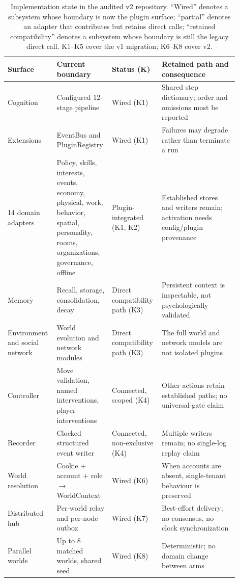 \begin{table}[t]
\centering
\small
\setlength{\tabcolsep}{4pt}
\caption{Implementation state in the audited v2 repository.  ``Wired''
denotes a subsystem whose boundary is now the plugin surface; ``partial''
denotes an adapter that contributes but retains direct calls; ``retained
compatibility'' denotes a subsystem whose boundary is still the legacy
direct call.  K1--K5 cover the v1 migration; K6--K8 cover v2.}
\label{tab:migration-state}
\begin{tabular}{@{}p{0.20\linewidth}p{0.20\linewidth}p{0.18\linewidth}p{0.32\linewidth}@{}}
\toprule
Surface & Current boundary & Status (K) & Retained path and consequence \\
\midrule
Cognition & Configured 12-stage pipeline & Wired (K1) & Shared step dictionary; order and omissions must be reported \\
Extensions & EventBus and PluginRegistry & Wired (K1) & Failures may degrade rather than terminate a run \\
14 domain adapters & Policy, skills, interests, events, economy, physical, work, behavior, spatial, personality, rooms, organizations, governance, offline & Plugin-integrated (K1, K2) & Established stores and writers remain; activation needs config/plugin provenance \\
Memory & Recall, storage, consolidation, decay & Direct compatibility path (K3) & Persistent context is inspectable, not psychologically validated \\
Environment and social network & World evolution and network modules & Direct compatibility path (K3) & The full world and network models are not isolated plugins \\
Controller & Move validation, named interventions, player interventions & Connected, scoped (K4) & Other actions retain established paths; no universal-gate claim \\
Recorder & Clocked structured event writer & Connected, non-exclusive (K4) & Multiple writers remain; no single-log replay claim \\
World resolution & Cookie + account + role $\rightarrow$ WorldContext & Wired (K6) & When accounts are absent, single-tenant behaviour is preserved \\
Distributed hub & Per-world relay and per-node outbox & Wired (K7) & Best-effort delivery; no consensus, no clock synchronization \\
Parallel worlds & Up to 8 matched worlds, shared seed & Wired (K8) & Deterministic; no domain change between arms \\
\bottomrule
\end{tabular}
\end{table}

